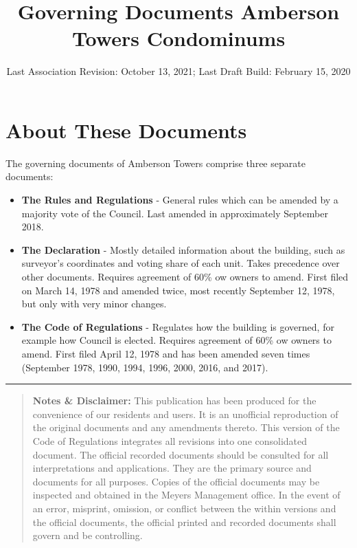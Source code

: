 \documentclass[
]{book}
\title{Governing Documents Amberson Towers Condominums}
\author{}
\date{\vspace{-2.5em}Last Association Revision: October 13, 2021; Last Draft Build: February 15, 2020}
\begin{document}
\maketitle

{
\setcounter{tocdepth}{1}
\tableofcontents
}
\hypertarget{about-these-documents}{%
\chapter*{About These Documents}\label{about-these-documents}}

The governing documents of Amberson Towers comprise three separate documents:

\begin{itemize}
\item
  \textbf{The Rules and Regulations} - General rules which can be amended by a majority vote of the Council. Last amended in approximately September 2018.
\item
  \textbf{The Declaration} - Mostly detailed information about the building, such as surveyor's coordinates and voting share of each unit. Takes precedence over other documents. Requires agreement of 60\% ow owners to amend. First filed on March 14, 1978 and amended twice, most recently September 12, 1978, but only with very minor changes.
\item
  \textbf{The Code of Regulations} - Regulates how the building is governed, for example how Council is elected. Requires agreement of 60\% ow owners to amend. First filed April 12, 1978 and has been amended seven times (September 1978, 1990, 1994, 1996, 2000, 2016, and 2017).
\end{itemize}

\begin{center}\rule{0.5\linewidth}{0.5pt}\end{center}

\begin{quote}
\textbf{Notes \& Disclaimer:} This publication has been produced for the convenience of our residents and users. It is an unofficial reproduction of the original documents and any amendments thereto. This version of the Code of Regulations integrates all revisions into one consolidated document. The official recorded documents should be consulted for all interpretations and applications. They are the primary source and documents for all purposes. Copies of the official documents may be inspected and obtained in the Meyers Management office. In the event of an error, misprint, omission, or conflict between the within versions and the official documents, the official printed and recorded documents shall govern and be controlling.
\end{quote}
\end{document}
